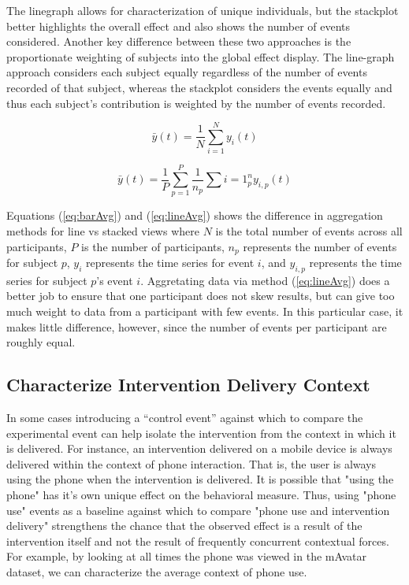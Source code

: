 The linegraph allows for characterization of unique individuals, but the stackplot better highlights the overall effect and also shows the number of events considered.
Another key difference between these two approaches is the proportionate weighting of subjects into the global effect display.
The line-graph approach considers each subject equally regardless of the number of events recorded of that subject, whereas the stackplot considers the events equally and thus each subject's contribution is weighted by the number of events recorded.

\begin{equation}
	\bar{y}(t) = \frac{1}{N} \sum\limits_{i=1}^N y_i(t)
	\label{eq:barAvg}
\end{equation}

\begin{equation}
	\bar{y}(t) = \frac{1}{P} \sum\limits_{p=1}^P \frac{1}{n_p} \sum\limits{i=1}^n_p y_{i,p}(t)
	\label{eq:lineAvg}
\end{equation}
	
Equations (\ref{eq:barAvg}) and (\ref{eq:lineAvg}) shows the difference in aggregation methods for line vs stacked views where $N$ is the total number of events across all participants, $P$ is the number of participants, $n_p$ represents the number of events for subject $p$,  $y_i$ represents the time series for event $i$, and $y_{i,p}$ represents the time series for subject $p$'s event $i$.
Aggretating data via method (\ref{eq:lineAvg}) does a better job to ensure that one participant does not skew results, but can give too much weight to data from a participant with few events.
In this particular case, it makes little difference, however, since the number of events per participant are roughly equal.

\subsection{Characterize Intervention Delivery Context}
In some cases introducing a “control event” against which to compare the experimental event can help isolate the intervention from the context in which it is delivered.
For instance, an intervention delivered on a mobile device is always delivered within the context of phone interaction.
That is, the user is always using the phone when the intervention is delivered.
It is possible that "using the phone" has it's own unique effect on the behavioral measure.
Thus, using "phone use" events as a baseline against which to compare "phone use and intervention delivery" strengthens the chance that the observed effect is a result of the intervention itself and not the result of frequently concurrent contextual forces. 
For example, by looking at all times the phone was viewed in the mAvatar dataset, we can characterize the average context of phone use.


